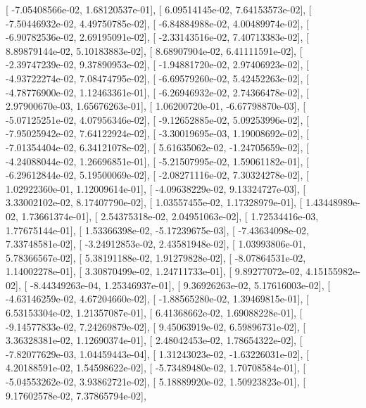 \documentclass{article}
\begin{document}
       [ -7.05408566e-02,   1.68120537e-01],
       [  6.09514145e-02,   7.64153573e-02],
       [ -7.50446932e-02,   4.49750785e-02],
       [ -6.84884988e-02,   4.00489974e-02],
       [ -6.90782536e-02,   2.69195091e-02],
       [ -2.33143516e-02,   7.40713383e-02],
       [  8.89879144e-02,   5.10183883e-02],
       [  8.68907904e-02,   6.41111591e-02],
       [ -2.39747239e-02,   9.37890953e-02],
       [ -1.94881720e-02,   2.97406923e-02],
       [ -4.93722274e-02,   7.08474795e-02],
       [ -6.69579260e-02,   5.42452263e-02],
       [ -4.78776900e-02,   1.12463361e-01],
       [ -6.26946932e-02,   2.74366478e-02],
       [  2.97900670e-03,   1.65676263e-01],
       [  1.06200720e-01,  -6.67798870e-03],
       [ -5.07125251e-02,   4.07956346e-02],
       [ -9.12652885e-02,   5.09253996e-02],
       [ -7.95025942e-02,   7.64122924e-02],
       [ -3.30019695e-03,   1.19008692e-02],
       [ -7.01354404e-02,   6.34121078e-02],
       [  5.61635062e-02,  -1.24705659e-02],
       [ -4.24088044e-02,   1.26696851e-01],
       [ -5.21507995e-02,   1.59061182e-01],
       [ -6.29612844e-02,   5.19500069e-02],
       [ -2.08271116e-02,   7.30324278e-02],
       [  1.02922360e-01,   1.12009614e-01],
       [ -4.09638229e-02,   9.13324727e-03],
       [  3.33002102e-02,   8.17407790e-02],
       [  1.03557455e-02,   1.17328979e-01],
       [  1.43448989e-02,   1.73661374e-01],
       [  2.54375318e-02,   2.04951063e-02],
       [  1.72534416e-03,   1.77675144e-01],
       [  1.53366398e-02,  -5.17239675e-03],
       [ -7.43634098e-02,   7.33748581e-02],
       [ -3.24912853e-02,   2.43581948e-02],
       [  1.03993806e-01,   5.78366567e-02],
       [  5.38191188e-02,   1.91279828e-02],
       [ -8.07864531e-02,   1.14002278e-01],
       [  3.30870499e-02,   1.24711733e-01],
       [  9.89277072e-02,   4.15155982e-02],
       [ -8.44349263e-04,   1.25346937e-01],
       [  9.36926263e-02,   5.17616003e-02],
       [ -4.63146259e-02,   4.67204660e-02],
       [ -1.88565280e-02,   1.39469815e-01],
       [  6.53153304e-02,   1.21357087e-01],
       [  6.41368662e-02,   1.69088228e-01],
       [ -9.14577833e-02,   7.24269879e-02],
       [  9.45063919e-02,   6.59896731e-02],
       [  3.36328381e-02,   1.12690374e-01],
       [  2.48042453e-02,   1.78654322e-02],
       [ -7.82077629e-03,   1.04459443e-04],
       [  1.31243023e-02,  -1.63226031e-02],
       [  4.20188591e-02,   1.54598622e-02],
       [ -5.73489480e-02,   1.70708584e-01],
       [ -5.04553262e-02,   3.93862721e-02],
       [  5.18889920e-02,   1.50923823e-01],
       [  9.17602578e-02,   7.37865794e-02],
\end{document}
